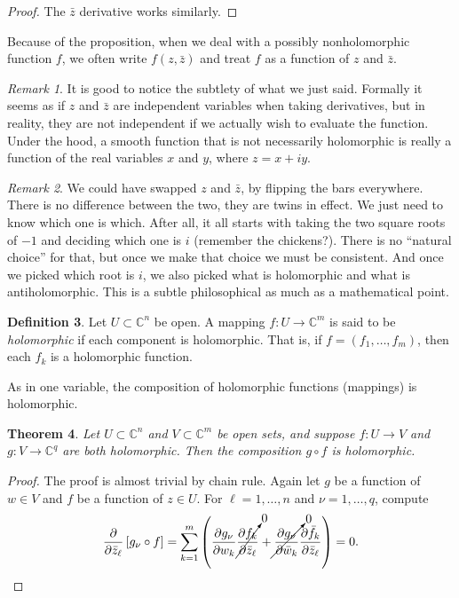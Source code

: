 \documentclass[12pt,openany]{book}
\newcommand{\C}{{\mathbb{C}}}
\theoremstyle{plain}
\newtheorem{thm}{Theorem}[section]
\theoremstyle{remark}
\newtheorem{remark}[thm]{Remark}
\theoremstyle{definition}
\newtheorem{defn}[thm]{Definition}
\theoremstyle{exercise}
\theoremstyle{example}
\begin{document}
\begin{proof}
The $\bar{z}$ derivative works similarly.
\end{proof}

Because of the proposition,
when we deal with a possibly
nonholomorphic function $f$, we often write $f(z,\bar{z})$ and treat $f$ as
a function of $z$ and $\bar{z}$.

\begin{remark}
It is good to notice the subtlety of what we just said.  Formally it seems
as if $z$ and $\bar{z}$ are independent variables when taking
derivatives, but in reality, they are not independent if we actually wish to
evaluate the function.  Under the hood, a smooth function that is not
necessarily holomorphic is really a function of the real variables
$x$ and $y$, where $z = x+iy$.
\end{remark}

\begin{remark}
We could have swapped $z$ and $\bar{z}$, by
flipping the bars everywhere.  There is no difference between the two,
they are twins in effect.  We just need to know which one is which.
After all, it all starts with taking the two square roots of $-1$ and
deciding which one is $i$ (remember the chickens?).
There is no ``natural choice'' for that, but once
we make that choice we must be consistent.  And once we picked which
root
is $i$, we also picked what is holomorphic and what is
antiholomorphic.  This is a subtle philosophical as much as a mathematical point.
\end{remark}

\begin{defn}
Let $U \subset \C^n$ be open.  A mapping $f \colon U \to \C^m$
is said to be \emph{holomorphic}
if each component is holomorphic.  That
is, if $f = (f_1,\ldots,f_m)$, then each $f_k$ is a holomorphic function.
\end{defn}

As in one variable, the composition of holomorphic functions (mappings) is
holomorphic.

\begin{thm}
Let $U \subset \C^n$ and $V \subset \C^m$ be open sets, and suppose
$f \colon U \to V$ and $g \colon V \to \C^q$ are both holomorphic.
%
Then the composition $g \circ f$ is holomorphic.
\end{thm}

\begin{proof}
The proof is almost trivial by chain rule.
Again let $g$ be a function of $w \in V$ and $f$ be a function of $z \in U$.
For $\ell = 1,\ldots,n$ and $\nu=1,\ldots,q$, compute
\begin{equation*}
\frac{\partial}{\partial \bar{z}_\ell} \left[ g_\nu \circ f \right]
=
\sum_{k=1}^m
\left(
\frac{\partial g_\nu}{\partial w_k}
\cancelto{0}{\frac{\partial f_k}{\partial \bar{z}_\ell}}
+
\cancelto{0}{\frac{\partial g_\nu}{\partial \bar{w}_k}}
\frac{\partial \bar{f}_k}{\partial \bar{z}_\ell}
\right)
=
0 . \qedhere
\end{equation*}
\end{proof}
\end{document}
